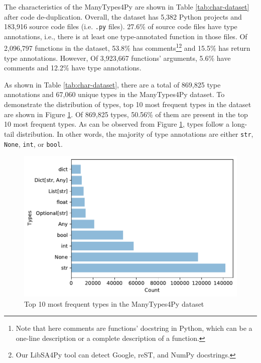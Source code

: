 \documentclass[10pt, conference]{IEEEtran}
\begin{document}
The characteristics of the ManyTypes4Py are shown in Table \ref{tab:char-dataset} after code de-duplication. Overall, the dataset has 5,382 Python projects and 183,916 source code files (i.e. \texttt{.py} files). 27.6\% of source code files have type annotations, i.e., there is at least one type-annotated function in those files. Of 2,096,797 functions in the dataset, 53.8\% has comments\footnote{Note that here comments are functions' docstring in Python, which can be a one-line description or a complete description of a function.}\footnote{Our LibSA4Py tool can detect Google, reST, and NumPy docstrings.} and 15.5\% has return type annotations. However, Of 3,923,667 functions' arguments, 5.6\% have comments and 12.2\% have type annotations.

As shown in Table \ref{tab:char-dataset}, there are a total of 869,825 type annotations and 67,060 unique types in the ManyTypes4Py dataset. To demonstrate the distribution of types, top 10 most frequent types in the dataset are shown in Figure \ref{fig:top-10-types}. Of 869,825 types, 50.56\% of them are present in the top 10 most frequent types. As can be observed from Figure \ref{fig:top-10-types}, types follow a long-tail distribution. In other words, the majority of type annotations are either \texttt{str}, \texttt{None}, \texttt{int}, or \texttt{bool}.

\begin{figure}[!t]
	\centering
	\includegraphics[width=\linewidth]{figs/top-10-most-frequent-types.pdf}
	\caption{Top 10 most frequent types in the ManyTypes4Py dataset}
	\label{fig:top-10-types}
\end{figure}
\end{document}
